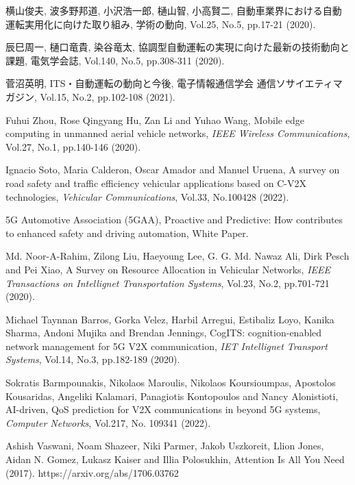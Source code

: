 \documentclass[a4paper,11pt,uplatex]{ujreport}
\begin{document}
\begin{thebibliography}{99}
  横山俊夫, 波多野邦道, 小沢浩一郎, 樋山智, 小高賢二, 自動車業界における自動運転実用化に向けた取り組み, 学術の動向, Vol.25, No.5, pp.17-21 (2020).

  辰巳周一, 樋口竜貴, 染谷竜太, 協調型自動運転の実現に向けた最新の技術動向と課題, 電気学会誌, Vol.140, No.5, pp.308-311 (2020).

  菅沼英明, ITS・自動運転の動向と今後, 電子情報通信学会 通信ソサイエティマガジン, Vol.15, No.2, pp.102-108 (2021).

  Fuhui Zhou, Rose Qingyang Hu, Zan Li and Yuhao Wang, Mobile edge computing in unmanned aerial vehicle networks, \textit{IEEE Wireless Communications}, Vol.27, No.1, pp.140-146 (2020).

  Ignacio Soto, Maria Calderon, Oscar Amador and Manuel Uruena, A survey on road safety and traffic efficiency vehicular applications based on C-V2X technologies, \textit{Vehicular Communications}, Vol.33, No.100428 (2022).

  5G Automotive Association (5GAA), Proactive and Predictive: How contributes to enhanced safety and driving automation, White Paper.

  Md. Noor-A-Rahim, Zilong Liu, Haeyoung Lee, G. G. Md. Nawaz Ali, Dirk Pesch and Pei Xiao, A Survey on Resource Allocation in Vehicular Networks, \textit{IEEE Transactions on Intellignet Transportation Systems}, Vol.23, No.2, pp.701-721 (2020).

  Michael Taynnan Barros, Gorka Velez, Harbil Arregui, Estibaliz Loyo, Kanika Sharma, Andoni Mujika and Brendan Jennings, CogITS: cognition-enabled network management for 5G V2X communication, \textit{IET Intellignet Transport Systems}, Vol.14, No.3, pp.182-189 (2020).

  Sokratis Barmpounakis, Nikolaos Maroulis, Nikolaos Koursioumpas, Apostolos Kousaridas, Angeliki Kalamari, Panagiotis Kontopoulos and Nancy Alonistioti, AI-driven, QoS prediction for V2X communications in beyond 5G systems, \textit{Computer Networks}, Vol.217, No. 109341 (2022).

  Ashish Vaswani, Noam Shazeer, Niki Parmer, Jakob Uszkoreit, Llion Jones, Aidan N. Gomez, Lukasz Kaiser and Illia Polosukhin, Attention Is All You Need (2017). https://arxiv.org/abs/1706.03762


\end{thebibliography}
\end{document}
